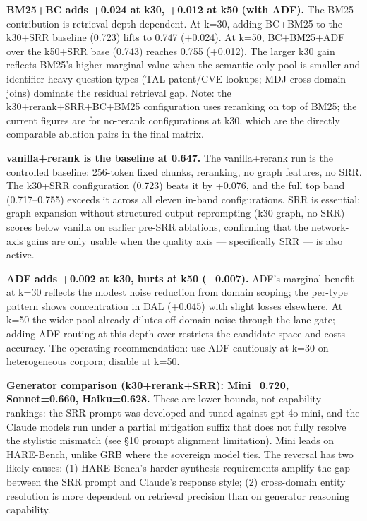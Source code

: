 \documentclass[
]{article}
\begin{document}
\textbf{BM25+BC adds +0.024 at k30, +0.012 at k50 (with ADF).} The BM25
contribution is retrieval-depth-dependent. At k=30, adding BC+BM25 to
the k30+SRR baseline (0.723) lifts to 0.747 (+0.024). At k=50,
BC+BM25+ADF over the k50+SRR base (0.743) reaches 0.755 (+0.012). The
larger k30 gain reflects BM25's higher marginal value when the
semantic-only pool is smaller and identifier-heavy question types (TAL
patent/CVE lookups; MDJ cross-domain joins) dominate the residual
retrieval gap. Note: the k30+rerank+SRR+BC+BM25 configuration uses
reranking on top of BM25; the current figures are for no-rerank
configurations at k30, which are the directly comparable ablation pairs
in the final matrix.

\textbf{vanilla+rerank is the baseline at 0.647.} The vanilla+rerank run
is the controlled baseline: 256-token fixed chunks, reranking, no graph
features, no SRR. The k30+SRR configuration (0.723) beats it by +0.076,
and the full top band (0.717--0.755) exceeds it across all eleven
in-band configurations. SRR is essential: graph expansion without
structured output reprompting (k30 graph, no SRR) scores below vanilla
on earlier pre-SRR ablations, confirming that the network-axis gains are
only usable when the quality axis --- specifically SRR --- is also
active.

\textbf{ADF adds +0.002 at k30, hurts at k50 (−0.007).} ADF's marginal
benefit at k=30 reflects the modest noise reduction from domain scoping;
the per-type pattern shows concentration in DAL (+0.045) with slight
losses elsewhere. At k=50 the wider pool already dilutes off-domain
noise through the lane gate; adding ADF routing at this depth
over-restricts the candidate space and costs accuracy. The operating
recommendation: use ADF cautiously at k=30 on heterogeneous corpora;
disable at k=50.

\textbf{Generator comparison (k30+rerank+SRR): Mini=0.720, Sonnet=0.660,
Haiku=0.628.} These are lower bounds, not capability rankings: the SRR
prompt was developed and tuned against gpt-4o-mini, and the Claude
models run under a partial mitigation suffix that does not fully resolve
the stylistic mismatch (see §10 prompt alignment limitation). Mini leads
on HARE-Bench, unlike GRB where the sovereign model ties. The reversal
has two likely causes: (1) HARE-Bench's harder synthesis requirements
amplify the gap between the SRR prompt and Claude's response style; (2)
cross-domain entity resolution is more dependent on retrieval precision
than on generator reasoning capability.
\end{document}
